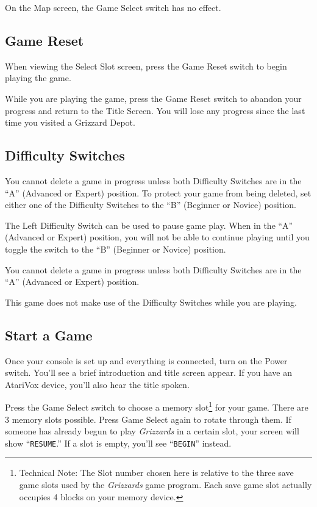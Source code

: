 \documentclass[12pt,openright,book]{memoir}
\begin{document}
On the Map screen, the Game Select switch has no effect.

\subsection{Game Reset}

When viewing  the Select  Slot screen,  press the  Game Reset  switch to
begin playing the game.

While you are  playing the game, press the Game  Reset switch to abandon
your progress and return to the Title Screen. You will lose any progress
since the last time you visited a Grizzard Depot.

\subsection{Difficulty Switches}

You cannot delete a game in progress unless both Difficulty Switches are
in the  ``A'' (Advanced or Expert)  position. To protect your  game from
being deleted,  set either one of  the Difficulty Switches to  the ``B''
(Beginner or Novice) position.

\ifdefined\TVSECAM

The Left Difficulty Switch  can be used to pause game  play. When in the
``A'' (Advanced  or Expert) position, you  will not be able  to continue
playing  until  you  toggle  the   switch  to  the  ``B''  (Beginner  or
Novice) position.

You cannot delete a game in progress unless both Difficulty Switches are
in the ``A'' (Advanced or Expert) position.

\else

This  game does  not  make  use of  the  Difficulty  Switches while  you
are playing. 

\fi

\subsection{Start a Game}
Once your  console is set  up and everything  is connected, turn  on the
Power switch. You'll  see a brief introduction and  title screen appear.
If you have an AtariVox device, you'll also hear the title spoken.

Press the Game Select switch  to choose a memory slot\footnote{Technical
  Note: The Slot  number chosen here is relative to  the three save game
  slots used by the \textit{Grizzards} game program. Each save game slot
  actually  occupies 4  blocks on  your memory  device.} for  your game.
There are  3 memory slots  possible. Press  Game Select again  to rotate
through them. If someone has already begun to play \textit{Grizzards} in
a certain slot, your screen will  show ``\texttt{RESUME}.'' If a slot is
empty, you'll see ``\texttt{BEGIN}'' instead.
\end{document}
